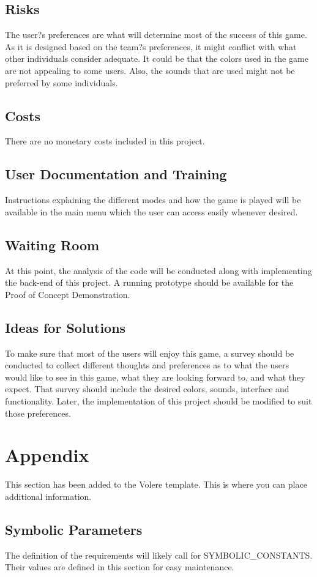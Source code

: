 \documentclass[12pt, titlepage]{article}
\begin{document}
\subsection{Risks}
The user?s preferences are what will determine most of the success of this game. As it is designed based on the team?s preferences, it might conflict with what other individuals consider adequate. It could be that the colors used in the game are not appealing to some users. Also, the sounds that are used might not be preferred by some individuals.

\subsection{Costs}
There are no monetary costs included in this project.

\subsection{User Documentation and Training}
Instructions explaining the different modes and how the game is played will be available in the main menu which the user can access easily whenever desired.

\subsection{Waiting Room}
At this point, the analysis of the code will be conducted along with implementing the back-end of this project. A running prototype should be available for the Proof of Concept Demonstration.

\subsection{Ideas for Solutions}
To make sure that most of the users will enjoy this game, a survey should be conducted to collect different thoughts and preferences as to what the users would like to see in this game, what they are looking forward to, and what they expect. That survey should include the desired colors, sounds, interface and functionality. Later, the implementation of this project should be modified to suit those preferences.



\newpage
\section{Appendix}
This section has been added to the Volere template.  This is where you can place
additional information.
\subsection{Symbolic Parameters}
The definition of the requirements will likely call for SYMBOLIC\_CONSTANTS.
Their values are defined in this section for easy maintenance.
\end{document}
